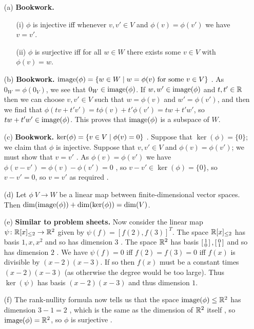 \documentclass[a4paper]{article}
\begin{document}
\begin{solution}
 \begin{itemize}
  \item[(a)] \textbf{Bookwork.}
   \begin{itemize}
    \item[(i)] $\phi$ is injective iff whenever $v,v'\in V$
     and $\phi(v)=\phi(v')$ we have $v=v'$. 
    \item[(ii)] $\phi$ is surjective iff for all $w\in W$
     there exists some $v\in V$ with $\phi(v)=w$. 
   \end{itemize}
  \item[(b)] \textbf{Bookwork.}
   $\operatorname{image}(\phi)=\{w\in W\;|\; w=\phi(v) \text{ for some } v\in V\}$ \mk.
   As $0_W=\phi(0_V)$, we see that $0_W\in\operatorname{image}(\phi)$.  \mk If
   $w,w'\in\operatorname{image}(\phi)$ and $t,t'\in{\mathbb{R}}$ then we can choose
   $v,v'\in V$ such that $w=\phi(v)$ and $w'=\phi(v')$, and then we
   find that $\phi(tv+t'v')=t\phi(v)+t'\phi(v')=tw+t'w'$, so
   $tw+t'w'\in\operatorname{image}(\phi)$.  This proves that $\operatorname{image}(\phi)$ is a
   subspace of $W$. 
  \item[(c)] \textbf{Bookwork.}  $\ker(\phi)=\{v\in V\;|\;\phi(v)=0\}$ \mk.
   Suppose that $\ker(\phi)=\{0\}$; we claim that $\phi$ is injective.
   Suppose that $v,v'\in V$ and $\phi(v)=\phi(v')$; we must show that
   $v=v'$ .  As $\phi(v)=\phi(v')$ we have
   $\phi(v-v')=\phi(v)-\phi(v')=0$ \mk, so $v-v'\in\ker(\phi)=\{0\}$, so
   $v-v'=0$, so $v=v'$ as required \mk.
  \item[(d)] Let $\phi\:V\to W$ be a linear map between
   finite-dimensional vector spaces.  Then
   $\dim(\operatorname{image}(\phi))+\dim(\ker(\phi))=\dim(V)$.  
  \item[(e)] \textbf{Similar to problem sheets.} 
   Now consider the linear map $\psi\colon{\mathbb{R}}[x]_{\leq 2}\to{\mathbb{R}}^2$ given by
   $\psi(f)=[f(2),f(3)]^T$.  The space ${\mathbb{R}}[x]_{\leq 2}$ has basis
   $1,x,x^2$ and so has dimension $3$ \mk. The space ${\mathbb{R}}^2$ has basis
   $\left[\begin{smallmatrix} 1\\0\end{smallmatrix}\right],\left[\begin{smallmatrix} 0\\1\end{smallmatrix}\right]$ and so has dimension $2$ \mk.  We have
   $\psi(f)=0$ iff $f(2)=f(3)=0$ iff $f(x)$ is divisible by
   $(x-2)(x-3)$.  If so then $f(x)$ must be a constant times
   $(x-2)(x-3)$ (as otherwise the degree would be too large).  Thus
   $\ker(\psi)$ has basis $(x-2)(x-3)$ and thus dimension $1$. 
  \item[(f)] The rank-nullity formula now tells us that the space
   $\operatorname{image}(\phi)\leq{\mathbb{R}}^2$ has dimension $3-1=2$ \mk, which is the same as
   the dimension of ${\mathbb{R}}^2$ itself \mk, so $\operatorname{image}(\phi)={\mathbb{R}}^2$, so $\phi$ is
   surjective \mk.
 \end{itemize}
\end{solution}
\end{document}

